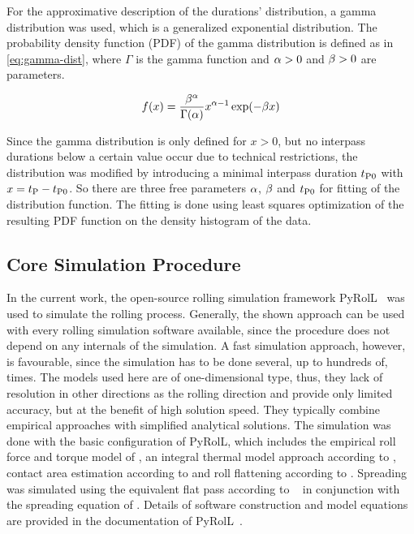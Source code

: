 For the approximative description of the durations' distribution, a gamma distribution was used, which is a generalized exponential distribution.
The probability density function (PDF) of the gamma distribution is defined as in \autoref{eq:gamma-dist}, where $\Gamma$ is the gamma function and ${\alpha} > 0$ and ${\beta} > 0$ are parameters.

\begin{equation}
    f(x) = \frac{{\beta}^{\alpha}}{\Gamma({\alpha})}x^{{\alpha} - 1} \exp(-{\beta} x)
    \label{eq:gamma-dist}
\end{equation}

Since the gamma distribution is only defined for $x>0$, but no interpass durations below a certain value occur due to technical restrictions, the distribution was modified by introducing a minimal interpass duration ${t_\mathrm{P0}}$ with $x = {t_\mathrm{P}} - {t_\mathrm{P0}}$.
So there are three free parameters ${\alpha}$, ${\beta}$ and ${t_\mathrm{P0}}$ for fitting of the distribution function.
The fitting is done using least squares optimization of the resulting PDF function on the density histogram of the data.

\subsection{Core Simulation Procedure}\label{subsec:simulation-procedure}

In the current work, the open-source rolling simulation framework PyRolL~\cite{pyroll2} was used to simulate the rolling process.
Generally, the shown approach can be used with every rolling simulation software available, since the procedure does not depend on any internals of the simulation.
A fast simulation approach, however, is favourable, since the simulation has to be done several, up to hundreds of, times.
The models used here are of one-dimensional type, thus, they lack of resolution in other directions as the rolling direction and provide only limited accuracy, but at the benefit of high solution speed.
They typically combine empirical approaches with simplified analytical solutions.
The simulation was done with the basic configuration of PyRolL, which includes the empirical roll force and torque model of \textcite{Hensel1978}, an integral thermal model approach according to \textcite{Hensel1990}, contact area estimation according to \textcite{Zouhar1960} and roll flattening according to \textcite{Hitchcock1935}.
Spreading was simulated using the equivalent flat pass according to \citeauthor*{Lendl1948}~\cite{Lendl1948, Lendl1948a, Lendl1949} in conjunction with the spreading equation of \textcite{Wusatowski1969}.
Details of software construction and model equations are provided in the documentation of PyRolL~\cite{pyroll}.
